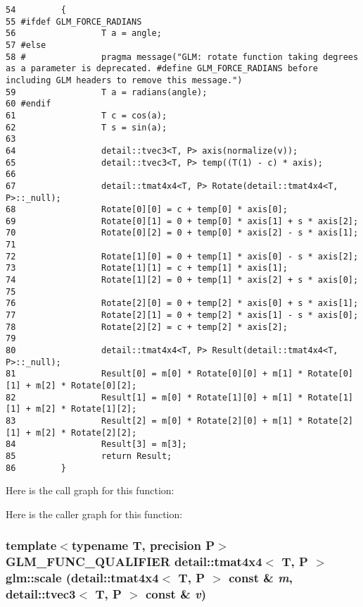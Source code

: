 \begin{Code}\begin{verbatim}54         {
55 #ifdef GLM_FORCE_RADIANS
56                 T a = angle;
57 #else
58 #               pragma message("GLM: rotate function taking degrees as a parameter is deprecated. #define GLM_FORCE_RADIANS before including GLM headers to remove this message.")
59                 T a = radians(angle);
60 #endif
61                 T c = cos(a);
62                 T s = sin(a);
63 
64                 detail::tvec3<T, P> axis(normalize(v));
65                 detail::tvec3<T, P> temp((T(1) - c) * axis);
66 
67                 detail::tmat4x4<T, P> Rotate(detail::tmat4x4<T, P>::_null);
68                 Rotate[0][0] = c + temp[0] * axis[0];
69                 Rotate[0][1] = 0 + temp[0] * axis[1] + s * axis[2];
70                 Rotate[0][2] = 0 + temp[0] * axis[2] - s * axis[1];
71 
72                 Rotate[1][0] = 0 + temp[1] * axis[0] - s * axis[2];
73                 Rotate[1][1] = c + temp[1] * axis[1];
74                 Rotate[1][2] = 0 + temp[1] * axis[2] + s * axis[0];
75 
76                 Rotate[2][0] = 0 + temp[2] * axis[0] + s * axis[1];
77                 Rotate[2][1] = 0 + temp[2] * axis[1] - s * axis[0];
78                 Rotate[2][2] = c + temp[2] * axis[2];
79 
80                 detail::tmat4x4<T, P> Result(detail::tmat4x4<T, P>::_null);
81                 Result[0] = m[0] * Rotate[0][0] + m[1] * Rotate[0][1] + m[2] * Rotate[0][2];
82                 Result[1] = m[0] * Rotate[1][0] + m[1] * Rotate[1][1] + m[2] * Rotate[1][2];
83                 Result[2] = m[0] * Rotate[2][0] + m[1] * Rotate[2][1] + m[2] * Rotate[2][2];
84                 Result[3] = m[3];
85                 return Result;
86         }
\end{verbatim}
\end{Code}




Here is the call graph for this function:

Here is the caller graph for this function:\hypertarget{group__gtc__matrix__transform_g5e2bf1cdf124863558884751d611aea6}{
\subsubsection[scale]{\setlength{\rightskip}{0pt plus 5cm}template$<$typename T, precision P$>$ GLM\_\-FUNC\_\-QUALIFIER detail::tmat4x4$<$ T, P $>$ glm::scale (detail::tmat4x4$<$ T, P $>$ const \& {\em m}, \/  detail::tvec3$<$ T, P $>$ const \& {\em v})}}
\label{group__gtc__matrix__transform_g5e2bf1cdf124863558884751d611aea6}


